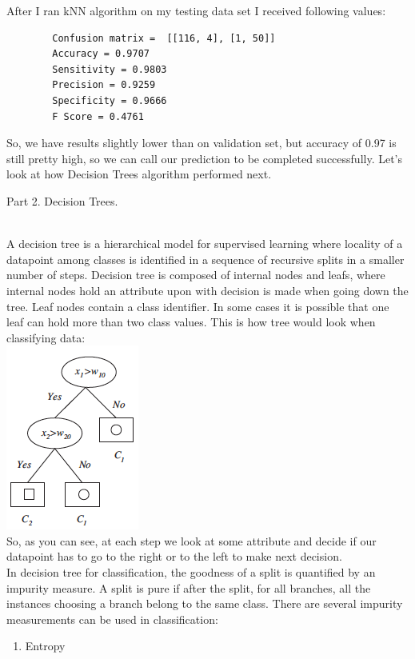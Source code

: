 \documentclass[12pt, letterpaper]{article}
\begin{document}
\begin{enumerate}[label=\Roman*.]
	After I ran kNN algorithm on my testing data set I received following values:
	\begin{verbatim}		
		Confusion matrix =  [[116, 4], [1, 50]] 
		Accuracy = 0.9707
		Sensitivity = 0.9803
		Precision = 0.9259
		Specificity = 0.9666
		F Score = 0.4761
	\end{verbatim}
	
	So, we have results slightly lower than on validation set, but accuracy of 0.97 is still pretty high, so we can call our prediction to be completed successfully. Let's look at how Decision Trees algorithm performed next.
	
	{\bf \item Part 2. Decision Trees. }\\
	A decision tree is a hierarchical model for supervised learning where locality of a datapoint among classes is identified in a sequence of recursive splits in a smaller number of steps. Decision tree is composed of internal nodes and leafs, where internal nodes hold an attribute upon with decision is made when going down the tree. Leaf nodes contain a class identifier. In some cases it is possible that one leaf can hold more than two class values. This is how tree would look when classifying data:\\
	\includegraphics[scale=0.9]{../images/2.png} \\
	So, as you can see, at each step we look at some attribute and decide if our datapoint has to go to the right or to the left to make next decision. \\
	In decision tree for classification, the goodness of a split is quantified by an impurity measure. A split is pure if after the split, for all branches, all the instances choosing a branch belong to the same class. There are several impurity measurements can be used in classification: \\
	\begin{enumerate}
		\item Entropy\\

\end{enumerate}
\end{enumerate}
\end{document}
